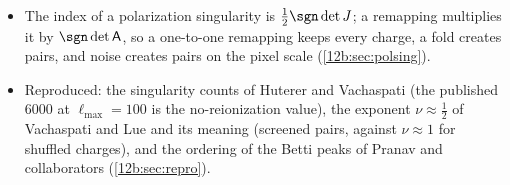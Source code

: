 \begin{recap}
\begin{itemize}[itemsep=1pt,leftmargin=1.2em]
        minima; for a Gaussian field their curves peak at $\nu\approx\PbWebPeakZero$, $\PbWebPeakOne$ and
        $\PbWebPeakTwo$, and their alternating sum reproduces the Gaussian $\chi$ (\cref{12b:sec:web}). Gravity changes
        this topology; a monotone relabelling does not.
  \item The index of a polarization singularity is $\frac12\sgn\det J$; a remapping multiplies it by $\sgn\det\mathsf A$,
        so a one-to-one remapping keeps every charge, a fold creates pairs, and noise creates pairs on the pixel scale
        (\cref{12b:sec:polsing}).
  \item Reproduced: the singularity counts of Huterer and Vachaspati (the published $6000$ at $\ell_{\max}=100$ is the
        no-reionization value), the exponent $\nu\approx\frac12$ of Vachaspati and Lue and its meaning (screened pairs,
        against $\nu\approx1$ for shuffled charges), and the ordering of the Betti peaks of Pranav and collaborators
        (\cref{12b:sec:repro}).
\end{itemize}
\end{recap}
\providecommand{\WLam}{}\renewcommand{\WLam}{0.0452}
\providecommand{\WLamOmP}{}\renewcommand{\WLamOmP}{0.0465}
\providecommand{\WLamOmM}{}\renewcommand{\WLamOmM}{0.0437}
\providecommand{\WLamRatio}{}\renewcommand{\WLamRatio}{0.62}
\providecommand{\WSigPix}{}\renewcommand{\WSigPix}{0.0129}
\providecommand{\WRatioR}{}\renewcommand{\WRatioR}{0.29}
\providecommand{\WSkewTheory}{}\renewcommand{\WSkewTheory}{0.88}
\providecommand{\WSkewLog}{}\renewcommand{\WSkewLog}{0.88}
\providecommand{\WSkewLogErr}{}\renewcommand{\WSkewLogErr}{0.003}
\providecommand{\WSkewGauss}{}\renewcommand{\WSkewGauss}{0.001}
\providecommand{\WSkewLogSm}{}\renewcommand{\WSkewLogSm}{0.44}
\providecommand{\WSkewGaussSm}{}\renewcommand{\WSkewGaussSm}{0.001}
\providecommand{\WSigGTwo}{}\renewcommand{\WSigGTwo}{0.079}
\providecommand{\WPowDev}{}\renewcommand{\WPowDev}{1.1}
\providecommand{\WPowDevLow}{}\renewcommand{\WPowDevLow}{10.9}
\providecommand{\WPowDevG}{}\renewcommand{\WPowDevG}{10.2}
\providecommand{\WClipped}{}\renewcommand{\WClipped}{0.00}
\providecommand{\WMinLog}{}\renewcommand{\WMinLog}{-0.0356}
\providecommand{\WSigSm}{}\renewcommand{\WSigSm}{0.0064}
\providecommand{\WNsimOne}{}\renewcommand{\WNsimOne}{100}
\providecommand{\WRoundE}{}\renewcommand{\WRoundE}{2.7\times10^{-15}}
\providecommand{\WRoundB}{}\renewcommand{\WRoundB}{1.8\times10^{-15}}
\providecommand{\WGamRms}{}\renewcommand{\WGamRms}{0.0089}
\providecommand{\WKapRms}{}\renewcommand{\WKapRms}{0.0126}
\providecommand{\WSigPixNoise}{}\renewcommand{\WSigPixNoise}{0.0723}
